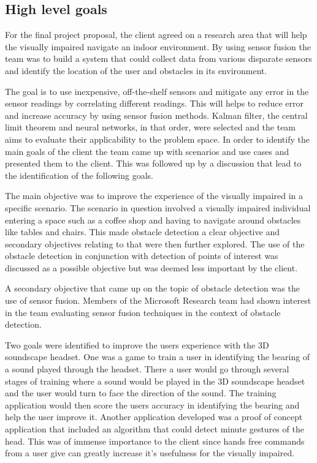 \documentclass[prodmode,acmtosem]{acmsmall} %
\begin{document}
\subsection{High level goals}

For the final project proposal, the client agreed on a research area that will help the visually impaired navigate an indoor environment.
By using sensor fusion the team was to build a system that could collect data from various disparate sensors and identify the location of the user and obstacles in its environment.

The goal is to use inexpensive, off-the-shelf sensors and mitigate any error in the sensor readings by correlating different readings. This will helps to reduce error and increase accuracy by using sensor fusion methods. Kalman filter, the central limit theorem and neural networks, in that order, were selected and the team aims to evaluate their applicability to the problem space. In order to identify the main goals of the client the team came up with scenarios and use cases and presented them to the client. This was followed up by a discussion that lead to the identification of the following goals.

The main objective was to improve the experience of the visually impaired in a specific scenario. The scenario in question involved a visually impaired individual entering a space such as a coffee shop and having to navigate around obstacles like tables and chairs.
This made obstacle detection a clear objective and secondary objectives relating to that were then further explored. The use of the obstacle detection in conjunction with detection of points of interest was discussed as a possible objective but was deemed less important by the client.

A secondary objective that came up on the topic of obstacle detection was the use of sensor fusion. Members of the Microsoft Research team had shown interest in the team evaluating sensor fusion techniques in the context of obstacle detection.

Two goals were identified to improve the users experience with the 3D soundscape headset. One was a game to train a user in identifying the bearing of a sound played through the headset. There a user would go through several stages of training where a sound would be played in the 3D soundscape headset and the user would turn to face the direction of the sound. The training application would then score the users accuracy in identifying the bearing and help the user improve it.
Another application developed was a proof of concept application that included an algorithm that could detect minute gestures of the head. This was of immense importance to the client since hands free commands from a user give can greatly increase it's usefulness for the visually impaired.
\end{document}
